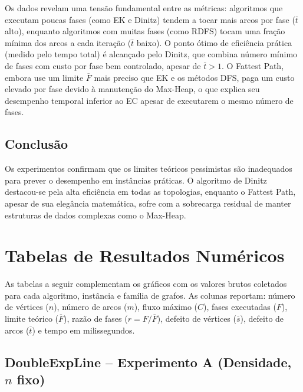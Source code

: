 \documentclass{infufrgs}
\begin{document}
Os dados revelam uma tensão fundamental entre as métricas: algoritmos que executam
poucas fases (como EK e Dinitz) tendem a tocar mais arcos por fase ($\overline{t}$
alto), enquanto algoritmos com muitas fases (como RDFS) tocam uma fração mínima dos
arcos a cada iteração ($\overline{t}$ baixo). O ponto ótimo de eficiência prática
(medido pelo tempo total) é alcançado pelo Dinitz, que combina número mínimo de
fases com custo por fase bem controlado, apesar de $\overline{t} > 1$. O Fattest
Path, embora use um limite $\overline{F}$ mais preciso que EK e os métodos DFS, paga
um custo elevado por fase devido à manutenção do Max-Heap, o que explica seu desempenho
temporal inferior ao EC apesar de executarem o mesmo número de fases.

\section{Conclusão}
Os experimentos confirmam que os limites teóricos pessimistas são inadequados para prever o desempenho em instâncias práticas. O algoritmo de Dinitz destacou-se pela alta eficiência em todas as topologias, enquanto o Fattest Path, apesar de sua elegância matemática, sofre com a sobrecarga residual de manter estruturas de dados complexas como o Max-Heap.

\appendix
\chapter{Tabelas de Resultados Numéricos}
\label{apx:tabelas}

As tabelas a seguir complementam os gráficos com os valores brutos coletados para cada
algoritmo, instância e família de grafos. As colunas reportam: número de vértices ($n$),
número de arcos ($m$), fluxo máximo ($C$), fases executadas ($F$), limite teórico
($\overline{F}$), razão de fases ($r = F/\overline{F}$), defeito de vértices
($\overline{s}$), defeito de arcos ($\overline{t}$) e tempo em milissegundos.

\section{DoubleExpLine -- Experimento A (Densidade, $n$ fixo)}
\end{document}
